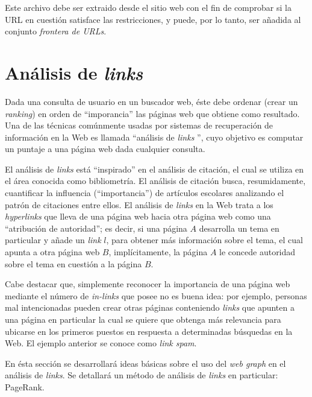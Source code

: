 			Este archivo debe ser extraido desde el sitio web con el fin de comprobar si la URL en cuestión satisface las restricciones, y puede, por lo tanto, ser añadida al conjunto \textit{frontera de URLs}.
			

\section{Análisis de \textit{links}}
	Dada una consulta de usuario en un buscador web, éste debe ordenar (crear un \textit{ranking}) en orden de \enquote{imporancia} las páginas web que obtiene como resultado. Una de las técnicas comúnmente usadas por sistemas de recuperación de información en la Web es llamada \enquote{análisis de \textit{links} }, cuyo objetivo es computar un puntaje a una página web dada cualquier consulta. \par
	
	El análisis de \textit{links} está \enquote{inspirado} en el análisis de citación, el cual se utiliza en el área conocida como bibliometría. El análisis de citación busca, resumidamente, cuantificar la influencia (\enquote{importancia}) de artículos escolares analizando el patrón de citaciones entre ellos. El análisis de \textit{links} en la Web trata a los \textit{hyperlinks} que lleva de una página web hacia otra página web como una \enquote{atribución de autoridad}; es decir, si una página $A$ desarrolla un tema en particular y añade un \textit{link} $l$, para obtener más información sobre el tema, el cual apunta a otra página web $B$, implícitamente, la página $A$ le concede autoridad sobre el tema en cuestión a la página $B$. \par
	
	Cabe destacar que, simplemente reconocer la importancia de una página web mediante el número de \textit{in-links} 	que posee no es buena idea: por ejemplo, personas mal intencionadas pueden crear otras páginas conteniendo \textit{links} que apunten a una página en particular la cual se quiere que obtenga más relevancia para ubicarse en los primeros puestos en respuesta a determinadas búsquedas en la Web. El ejemplo anterior se conoce como \textit{link spam}. \par
	
	En ésta sección se desarrollará ideas básicas sobre el uso del \textit{web graph} en el análisis de \textit{links}. Se detallará un método de análisis de \textit{links} en particular: PageRank.
	
